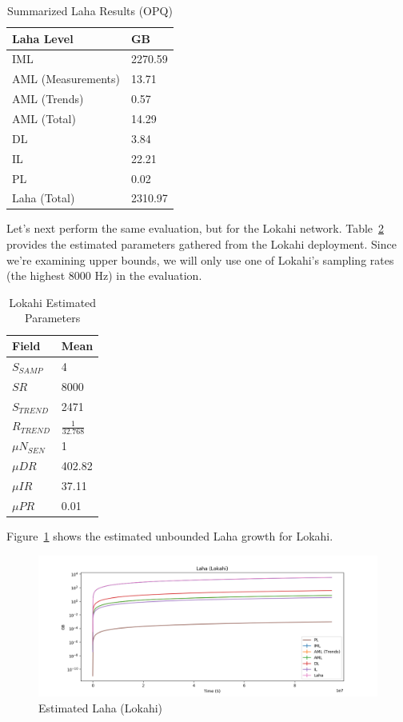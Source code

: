 \begin{table}[H]
	\centering
	\caption{Summarized Laha Results (OPQ)}
	\begin{tabularx}{\textwidth}{ll}
		\toprule
		\textbf{Laha Level} & \bm{$\mu Size$} \textbf{GB} \\
		\midrule
		IML & 2270.59 \\
		AML (Measurements) & 13.71 \\
		AML (Trends) & 0.57  \\
		AML (Total) & 14.29  \\
		DL & 3.84  \\
		IL & 22.21 \\
		PL & 0.02  \\
		Laha (Total) & 2310.97  \\
		\bottomrule
	\end{tabularx}
	\label{table:summarized_laha_results_opq}
\end{table}

Let's next perform the same evaluation, but for the Lokahi network. Table~\ref{table:estimated_laha_lokahi} provides the estimated parameters gathered from the Lokahi deployment. Since we're examining upper bounds, we will only use one of Lokahi's sampling rates (the highest 8000 Hz) in the evaluation.

\begin{table}[H]
	\centering
	\caption{Lokahi Estimated Parameters}
	\begin{tabularx}{\textwidth}{ll}
		\toprule
		\textbf{Field} & \textbf{Mean} \\
		\midrule
		$S_{SAMP}$ & 4 \\
		$SR$ & 8000 \\
		$S_{TREND}$ & 2471  \\
		$R_{TREND}$ & $\frac{1}{32.768}$  \\
		$\mu N_{SEN}$ & 1  \\
		$\mu DR$ & 402.82  \\
		$\mu IR$ & 37.11 \\
		$\mu PR$ & 0.01 \\
		\bottomrule
	\end{tabularx}
	\label{table:estimated_laha_lokahi}
\end{table}

Figure~\ref{fig:plot_lala_lokahi} shows the estimated unbounded Laha growth for Lokahi.

\begin{figure}[H]
	\centering
	\includegraphics[width=\linewidth]{figures/plot_laha_lokahi.png}
	\caption{Estimated Laha (Lokahi)}
	\label{fig:plot_lala_lokahi}
\end{figure}


